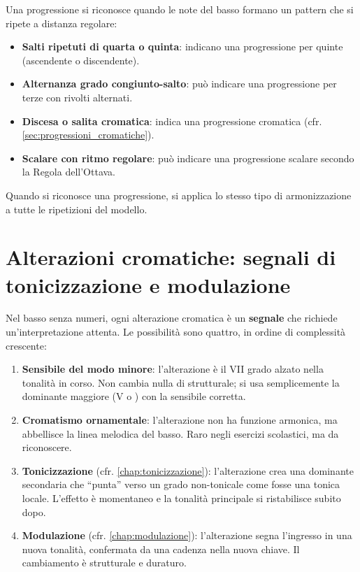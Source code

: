 \begin{regola}
	\label{reg:riconoscimento_progressione}
	Una progressione si riconosce quando le note del basso formano un pattern che si ripete a distanza regolare:
	\begin{itemize}
		\item \textbf{Salti ripetuti di quarta o quinta}: indicano una progressione per quinte (ascendente o discendente).
		\item \textbf{Alternanza grado congiunto-salto}: può indicare una progressione per terze con rivolti alternati.
		\item \textbf{Discesa o salita cromatica}: indica una progressione cromatica (cfr. \ref{sec:progressioni_cromatiche}).
		\item \textbf{Scalare con ritmo regolare}: può indicare una progressione scalare secondo la Regola dell'Ottava.
	\end{itemize}
	Quando si riconosce una progressione, si applica lo stesso tipo di armonizzazione a tutte le ripetizioni del modello.
\end{regola}

\section{Alterazioni cromatiche: segnali di tonicizzazione e modulazione}
\label{sec:cromatismi_basso}

Nel basso senza numeri, ogni alterazione cromatica è un \textbf{segnale} che richiede un'interpretazione attenta. Le possibilità sono quattro, in ordine di complessità crescente:

\begin{enumerate}
	\item \textbf{Sensibile del modo minore}: l'alterazione è il VII grado alzato nella tonalità in corso. Non cambia nulla di strutturale; si usa semplicemente la dominante maggiore (V o ) con la sensibile corretta.
	\item \textbf{Cromatismo ornamentale}: l'alterazione non ha funzione armonica, ma abbellisce la linea melodica del basso. Raro negli esercizi scolastici, ma da riconoscere.
	\item \textbf{Tonicizzazione} (cfr. \ref{chap:tonicizzazione}): l'alterazione crea una dominante secondaria che ``punta'' verso un grado non-tonicale come fosse una tonica locale. L'effetto è momentaneo e la tonalità principale si ristabilisce subito dopo.
	\item \textbf{Modulazione} (cfr. \ref{chap:modulazione}): l'alterazione segna l'ingresso in una nuova tonalità, confermata da una cadenza nella nuova chiave. Il cambiamento è strutturale e duraturo.
\end{enumerate}

